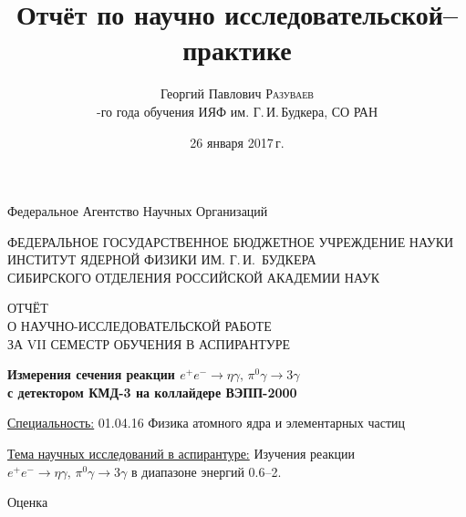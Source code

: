 \documentclass[14pt,a4paper]{extarticle}
\title{Отчёт по научно исследовательской--практике}%
\author{Георгий Павлович \textsc{Разуваев}\\{\smallаспирант 3-го года обучения ИЯФ им. Г.\,И.\,Будкера, СО РАН}} %
\date{26 января 2017\,г.} %
\begin{document}

\begin{titlepage}

\begin{center}

Федеральное Агентство Научных Организаций

\vspace{.5cm}

ФЕДЕРАЛЬНОЕ ГОСУДАРСТВЕННОЕ БЮДЖЕТНОЕ УЧРЕЖДЕНИЕ НАУКИ \\
ИНСТИТУТ ЯДЕРНОЙ ФИЗИКИ ИМ. Г.\,И.~БУДКЕРА \\
СИБИРСКОГО ОТДЕЛЕНИЯ РОССИЙСКОЙ АКАДЕМИИ НАУК

\vspace{2cm}

ОТЧЁТ \\
О НАУЧНО-ИССЛЕДОВАТЕЛЬСКОЙ РАБОТЕ \\
ЗА VII СЕМЕСТР ОБУЧЕНИЯ В АСПИРАНТУРЕ

\vspace{1.5cm}

\boldmath
\textbf{Измерения сечения реакции
$e^+ e^- \to \eta \gamma, \, \pi^0 \gamma \to 3 \gamma$\\
с детектором КМД-3 на коллайдере ВЭПП-2000}
\unboldmath


\end{center}

\vspace{2cm}

\underline{Специальность:} 01.04.16 Физика атомного ядра и элементарных частиц

\vspace{.5cm}

\underline{Тема научных исследований в аспирантуре:} Изучения реакции $e^+ e^- \to \eta \gamma, \, \pi^0 \gamma \to 3 \gamma$ в диапазоне энергий \SIrange{.6}{2.}{\GeVr}

\vspace{2cm}

\begin{minipage}[t]{0.5\textwidth}
\hspace{3cm}
\end{minipage}
\begin{minipage}[t]{0.5\textwidth}
Оценка \underline{\hspace{3cm}}
\end{minipage}



\end{titlepage}
\end{document}
